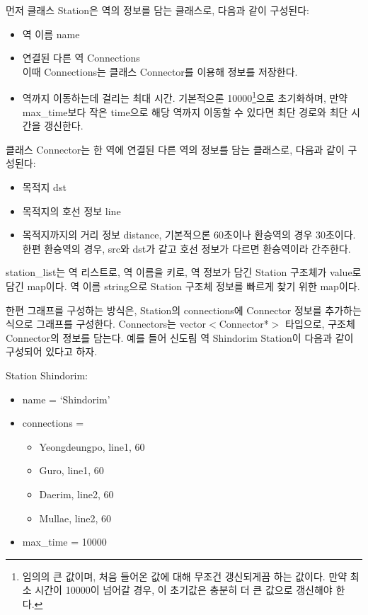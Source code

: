 \documentclass{article}
\begin{document}
먼저 클래스 Station은 역의 정보를 담는 클래스로, 다음과 같이 구성된다:
\begin{itemize}
    \item 역 이름 name
    \item 연결된 다른 역 Connections\\
    이때 Connections는 클래스 Connector를 이용해 정보를 저장한다.
    \item 역까지 이동하는데 걸리는 최대 시간. 기본적으론 10000\footnote{임의의 큰 값이며, 처음 들어온 값에 대해 무조건 갱신되게끔 하는 값이다. 만약 최소 시간이 10000이 넘어갈 경우, 이 초기값은 충분히 더 큰 값으로 갱신해야 한다.}으로 초기화하며, 만약 max\_time보다 작은 time으로 해당 역까지 이동할 수 있다면 최단 경로와 최단 시간을 갱신한다.
\end{itemize}

클래스 Connector는 한 역에 연결된 다른 역의 정보를 담는 클래스로, 다음과 같이 구성된다:
\begin{itemize}
    \item 목적지 dst
    \item 목적지의 호선 정보 line
    \item 목적지까지의 거리 정보 distance, 기본적으론 60초이나 환승역의 경우 30초이다. 한편 환승역의 경우, src와 dst가 같고 호선 정보가 다르면 환승역이라 간주한다.
\end{itemize}

station\_list는 역 리스트로, 역 이름을 키로, 역 정보가 담긴 Station 구조체가 value로 담긴 map이다. 역 이름 string으로 Station 구조체 정보를 빠르게 찾기 위한 map이다.

한편 그래프를 구성하는 방식은, Station의 connections에 Connector 정보를 추가하는 식으로 그래프를 구성한다. Connectors는 vector$<$Connector*$>$ 타입으로, 구조체 Connector의 정보를 담는다. 예를 들어 신도림 역 Shindorim Station이 다음과 같이 구성되어 있다고 하자.

Station Shindorim:
\begin{itemize}
    \item name = `Shindorim'
    \item connections = 
    \begin{itemize}
        \item Yeongdeungpo, line1, 60
        \item Guro, line1, 60
        \item Daerim, line2, 60
        \item Mullae, line2, 60
    \end{itemize}
    \item max\_time = 10000
\end{itemize}
\end{document}
